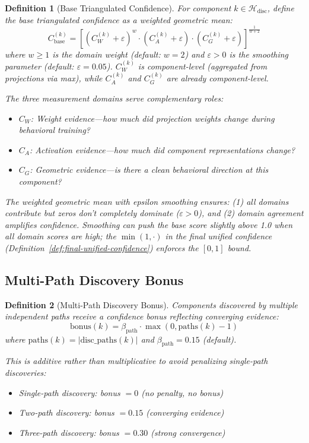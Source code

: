 \documentclass[11pt]{article}
\newtheorem{definition}{Definition}[section]
\begin{document}
\begin{definition}[Base Triangulated Confidence]
\label{def:base-triangulated-confidence}
For component $k \in \mathcal{H}_{\text{disc}}$, define the base triangulated confidence as a weighted geometric mean:
\begin{equation}
C^{(k)}_{\text{base}} = \left[(C^{(k)}_W + \varepsilon)^w \cdot (C^{(k)}_A + \varepsilon) \cdot (C^{(k)}_G + \varepsilon)\right]^{\frac{1}{w+2}}
\end{equation}
where $w \geq 1$ is the domain weight (default: $w = 2$) and $\varepsilon > 0$ is the smoothing parameter (default: $\varepsilon = 0.05$). $C^{(k)}_W$ is component-level (aggregated from projections via max), while $C^{(k)}_A$ and $C^{(k)}_G$ are already component-level.

The three measurement domains serve complementary roles:
\begin{itemize}[nosep]
\item $C_W$: Weight evidence---how much did projection weights change during behavioral training?
\item $C_A$: Activation evidence---how much did component representations change?
\item $C_G$: Geometric evidence---is there a clean behavioral direction at this component?
\end{itemize}
The weighted geometric mean with epsilon smoothing ensures: (1) all domains contribute but zeros don't completely dominate ($\varepsilon > 0$), and (2) domain agreement amplifies confidence. Smoothing can push the base score slightly above 1.0 when all domain scores are high; the $\min(1, \cdot)$ in the final unified confidence (Definition~\ref{def:final-unified-confidence}) enforces the $[0, 1]$ bound.
\end{definition}

\subsection{Multi-Path Discovery Bonus}
\label{sec:multi-path-discovery-bonus}

\begin{definition}[Multi-Path Discovery Bonus]
\label{def:multi-path-discovery-bonus}
Components discovered by multiple independent paths receive a confidence bonus reflecting converging evidence:
\begin{equation}
\text{bonus}(k) = \beta_{\text{path}} \cdot \max(0, \text{paths}(k) - 1)
\end{equation}
where $\text{paths}(k) = |\text{disc\_paths}(k)|$ and $\beta_{\text{path}} = 0.15$ (default).

This is additive rather than multiplicative to avoid penalizing single-path discoveries:
\begin{itemize}[nosep]
\item Single-path discovery: bonus $= 0$ (no penalty, no bonus)
\item Two-path discovery: bonus $= 0.15$ (converging evidence)
\item Three-path discovery: bonus $= 0.30$ (strong convergence)
\end{itemize}
\end{definition}
\end{document}
